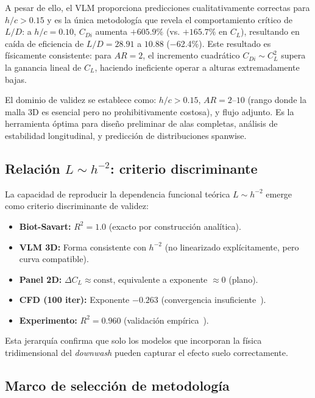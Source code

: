\documentclass[twocolumn]{article}
\begin{document}
A pesar de ello, el VLM proporciona predicciones cualitativamente correctas para $h/c > 0.15$ y es la única metodología que revela el comportamiento crítico de $L/D$: a $h/c = 0.10$, $C_{Di}$ aumenta $+605.9\%$ (vs. $+165.7\%$ en $C_L$), resultando en caída de eficiencia de $L/D = 28.91$ a $10.88$ (−62.4\%). Este resultado es físicamente consistente: para $AR = 2$, el incremento cuadrático $C_{Di} \sim C_L^2$ supera la ganancia lineal de $C_L$, haciendo ineficiente operar a alturas extremadamente bajas.

El dominio de validez se establece como: $h/c > 0.15$, $AR = 2$--$10$ (rango donde la malla 3D es esencial pero no prohibitivamente costosa), y flujo adjunto. Es la herramienta óptima para diseño preliminar de alas completas, análisis de estabilidad longitudinal, y predicción de distribuciones spanwise.

\subsection{Relación $L \sim h^{-2}$: criterio discriminante}

La capacidad de reproducir la dependencia funcional teórica $L \sim h^{-2}$ emerge como criterio discriminante de validez:

\begin{itemize}
    \item \textbf{Biot-Savart:} $R^2 = 1.0$ (exacto por construcción analítica).
    \item \textbf{VLM 3D:} Forma consistente con $h^{-2}$ (no linearizado explícitamente, pero curva compatible).
    \item \textbf{Panel 2D:} $\Delta C_L \approx \text{const}$, equivalente a exponente $\approx 0$ (plano).
    \item \textbf{CFD (100 iter):} Exponente $-0.263$ (convergencia insuficiente~\cite{autodesk2024}).
    \item \textbf{Experimento:} $R^2 = 0.960$ (validación empírica~\cite{hernandez2012}).
\end{itemize}

Esta jerarquía confirma que solo los modelos que incorporan la física tridimensional del \textit{downwash} pueden capturar el efecto suelo correctamente.

\subsection{Marco de selección de metodología}
\end{document}
